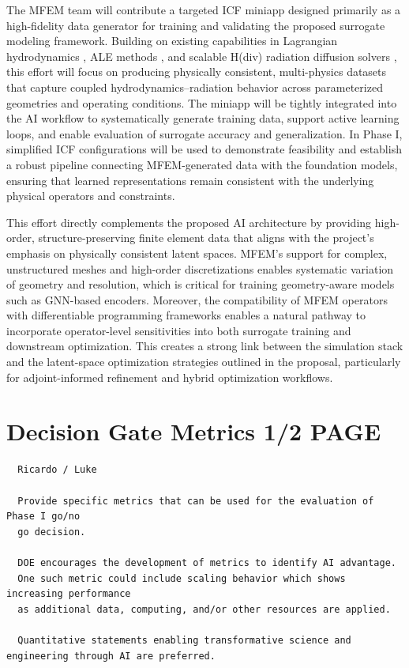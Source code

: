 The MFEM team will contribute a targeted ICF miniapp designed primarily as a
high-fidelity data generator for training and validating the proposed surrogate
modeling framework. Building on existing capabilities in Lagrangian
hydrodynamics \cite{Dobrev2012}, ALE methods \cite{Tomov2018}, and scalable
H(div) radiation diffusion solvers \cite{Pazner2025}, this effort will focus on
producing physically consistent, multi-physics datasets that capture coupled
hydrodynamics–radiation behavior across parameterized geometries and operating
conditions. The miniapp will be tightly integrated into the AI workflow to
systematically generate training data, support active learning loops, and
enable evaluation of surrogate accuracy and generalization. In Phase I,
simplified ICF configurations will be used to demonstrate feasibility and
establish a robust pipeline connecting MFEM-generated data with the foundation
models, ensuring that learned representations remain consistent with the
underlying physical operators and constraints.

This effort directly complements the proposed AI architecture by providing
high-order, structure-preserving finite element data that aligns with the
project’s emphasis on physically consistent latent spaces. MFEM’s support for
complex, unstructured meshes and high-order discretizations enables systematic
variation of geometry and resolution, which is critical for training
geometry-aware models such as GNN-based encoders. Moreover, the compatibility
of MFEM operators with differentiable programming frameworks enables a natural
pathway to incorporate operator-level sensitivities into both surrogate
training and downstream optimization. This creates a strong link between the
simulation stack and the latent-space optimization strategies outlined in the
proposal, particularly for adjoint-informed refinement and hybrid optimization
workflows.



\newpage
\section{    Decision Gate Metrics \hspace{1.0in} 1/2 PAGE}

\tiny \small \begin{verbatim}
  Ricardo / Luke

  Provide specific metrics that can be used for the evaluation of Phase I go/no
  go decision.

  DOE encourages the development of metrics to identify AI advantage.
  One such metric could include scaling behavior which shows increasing performance
  as additional data, computing, and/or other resources are applied.

  Quantitative statements enabling transformative science and engineering through AI are preferred.
\end{verbatim}

\normalsize

